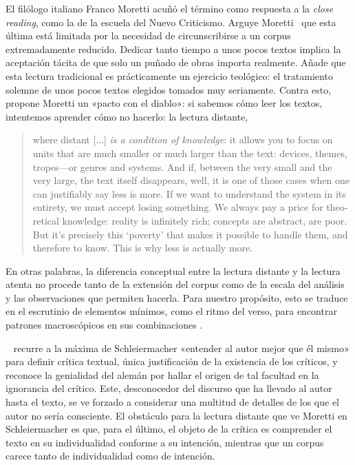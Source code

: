 El filólogo italiano Franco Moretti acuñó el término como respuesta a la \textit{close reading}, como la de la escuela del Nuevo Criticismo. Arguye Moretti~\parencite*[57]{moretti2000} que esta última está limitada por la necesidad de circunscribirse a un corpus extremadamente reducido. Dedicar tanto tiempo a unos pocos textos implica la aceptación tácita de que solo un puñado de obras importa realmente. Añade que esta lectura tradicional es prácticamente un ejercicio teológico: el tratamiento solemne de unos pocos textos elegidos tomados muy seriamente. Contra esto, propone Moretti un «pacto con el diablo»: si sabemos cómo leer los textos, intentemos aprender cómo no hacerlo: la lectura distante,
\blockquote{\begin{english}where distant [...] \textit{is a condition of knowledge}: it allows you to focus on units that are much smaller or much larger than the text: devices, themes, tropes—or genres and systems. And if, between the very small and the very large, the text itself disappears, well, it is one of those cases when one can justifiably say less is more. If we want to understand the system in its entirety, we must accept losing something. We always pay a price for theoretical knowledge: reality is infinitely rich; concepts are abstract, are poor. But it's precisely this `poverty' that makes it possible to handle them, and therefore to know. This is why less is actually more.\end{english} \parencite[57-58]{moretti2000}}. En otras palabras, la diferencia conceptual entre la  lectura distante y la lectura atenta no procede tanto de la extensión del corpus como de la escala del análisis y las observaciones que permiten hacerla. Para nuestro propósito, esto se traduce en el escrutinio de elementos mínimos, como el ritmo del verso, para encontrar patrones macroscópicos en sus combinaciones \parencite[p. 343, n. 2]{kroll2023}.

\citeauthor{moretti2017}~\parencite*{moretti2017} recurre a la máxima de Schleiermacher «entender al autor mejor que él mismo» para definir crítica textual, única justificación de la existencia de los críticos, y reconoce la genialidad del alemán por hallar el origen de tal  facultad en la ignorancia del crítico. Este, desconocedor del discurso que ha llevado al autor hasta el texto, se ve forzado a considerar una multitud de detalles de los que el autor no sería consciente. El obstáculo para la lectura distante que ve Moretti en Schleiermacher es que, para el último, el objeto de la crítica es comprender el texto en su individualidad conforme a su intención, mientras que un corpus carece tanto de individualidad como de intención. 

